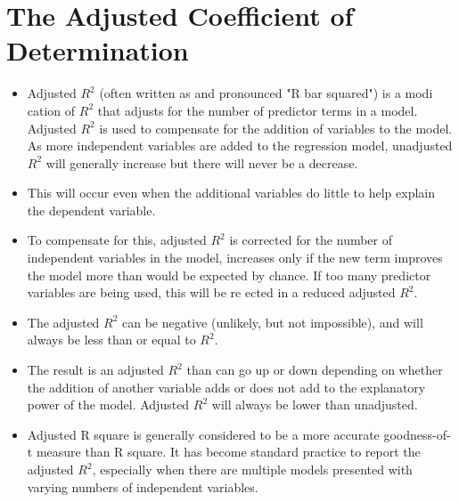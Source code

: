 \documentclass[]{report}
\begin{document}
\section*{The Adjusted Coefficient of Determination}
\begin{itemize}
	\item  Adjusted $R^2$ (often written as and pronounced "R bar squared") is a modi
	cation of $R^2$ that adjusts for the number of predictor terms in a model. Adjusted $R^2$ is used to compensate
	for the addition of variables to the model. As more independent variables are added to the regression
	model, unadjusted $R^2$ will generally increase but there will never be a decrease.
	\item  This will occur even when the additional variables do little to help explain the dependent variable.
	\item  To compensate for this, adjusted $R^2$ is corrected for the number of independent variables in the model,
	increases only if the new term improves the model more than would be expected by chance. If too many
	predictor variables are being used, this will be re
	ected in a reduced adjusted $R^2$.
	\item  The adjusted $R^2$ can be negative (unlikely, but not impossible), and will always be less than or equal to
	$R^2$.
	\item  The result is an adjusted $R^2$ than can go up or down depending on whether the addition of another
	variable adds or does not add to the explanatory power of the model. Adjusted $R^2$ will always be lower
	than unadjusted.
	\item  Adjusted R square is generally considered to be a more accurate goodness-of-
	t measure than R square. It has become standard practice to report the adjusted $R^2$, especially when
	there are multiple models presented with varying numbers of independent variables.
\end{itemize}
\end{document}
